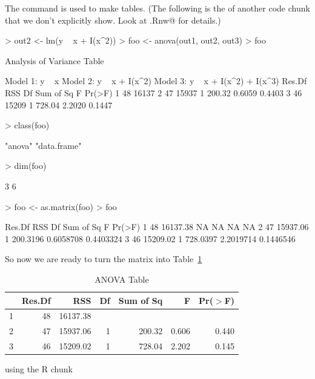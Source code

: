 \documentclass{article}
\begin{document}
The \verb@xtable@ command is used to make tables.  (The following
is the \verb@Sweave@ of another code chunk that we don't explicitly
show.  Look at \verb@foo.Rnw@ for details.)
\begin{Schunk}
\begin{Sinput}
> out2 <- lm(y ~ x + I(x^2))
> foo <- anova(out1, out2, out3)
> foo
\end{Sinput}
\begin{Soutput}
Analysis of Variance Table

Model 1: y ~ x
Model 2: y ~ x + I(x^2)
Model 3: y ~ x + I(x^2) + I(x^3)
  Res.Df   RSS Df Sum of Sq      F Pr(>F)
1     48 16137                           
2     47 15937  1    200.32 0.6059 0.4403
3     46 15209  1    728.04 2.2020 0.1447
\end{Soutput}
\begin{Sinput}
> class(foo)
\end{Sinput}
\begin{Soutput}
[1] "anova"      "data.frame"
\end{Soutput}
\begin{Sinput}
> dim(foo)
\end{Sinput}
\begin{Soutput}
[1] 3 6
\end{Soutput}
\begin{Sinput}
> foo <- as.matrix(foo)
> foo
\end{Sinput}
\begin{Soutput}
  Res.Df      RSS Df Sum of Sq         F    Pr(>F)
1     48 16137.38 NA        NA        NA        NA
2     47 15937.06  1  200.3196 0.6058708 0.4403324
3     46 15209.02  1  728.0397 2.2019714 0.1446546
\end{Soutput}
\end{Schunk}
So now we are ready to turn the matrix \verb@foo@
into Table~\ref{tab:one}
\begin{table}[tbp]
\centering
\caption{ANOVA Table} 
\label{tab:one}
\begin{tabular}{rrrrrrr}
  \hline
 & Res.Df & RSS & Df & Sum of Sq & F & Pr($>$F) \\ 
  \hline
1 & 48 & 16137.38 &  &  &  &  \\ 
  2 & 47 & 15937.06 & 1 & 200.32 & 0.606 & 0.440 \\ 
  3 & 46 & 15209.02 & 1 & 728.04 & 2.202 & 0.145 \\ 
   \hline
\end{tabular}
\end{table}using the R chunk
\end{document}
